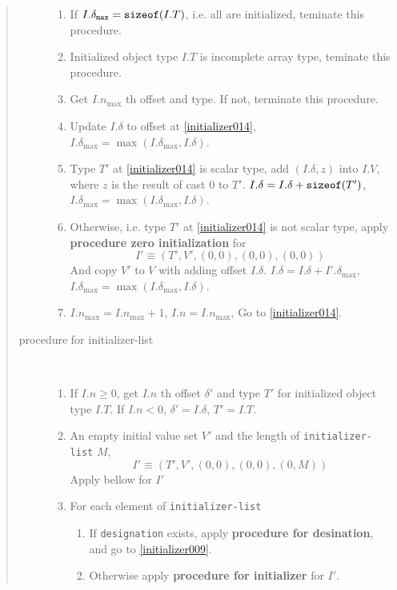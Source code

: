 \begin{quotation}
\begin{description}
\begin{enumerate}
\item If $I.\delta_{\tt{max}} = {\tt sizeof}(I.T)$, i.e.
      all are initialized, teminate this procedure.

\item Initialized object type $I.T$ is incomplete array type,
      teminate this procedure.

\item \label{initializer014} 
      Get $I.n_{\max}$ th offset and type. If not, terminate
      this procedure.

\item Update $I.\delta$ to offset at \ref{initializer014},
      $I.\delta_{\max} = {\max}({I.\delta}_{\max},I.{\delta})$.

\item Type $T'$ at \ref{initializer014} is scalar type,
      add $(I.\delta,z)$ into $I.V$, where $z$ is the result of
      cast $0$ to $T'$.
      $I.\delta = I.\delta + {\tt{sizeof}}(T')$,
       $I.\delta_{\max} = {\max}(I.{\delta}_{\max},I.{\delta})$.

\item Otherwise, i.e. type $T'$ at \ref{initializer014} is not scalar
      type, apply {\bf procedure zero initialization} for
\[
 I' \equiv (T',V',(0,0),(0,0),(0,0))
\]
And copy $V'$ to $V$ with adding offset $I.\delta$.
$I.\delta = I.\delta + I'.{\delta_{\max}}$,
$I.\delta_{\max} = {\max}(I.\delta_{\max},I.\delta)$.

\item $I.n_{\max} = I.n_{\max} + 1$, $I.n = I.n_{\max}$,
Go to \ref{initializer014}.
\end{enumerate}


\item[procedure for initializer-list]

\

\begin{enumerate}
\item \label{initializer005}
      If $I.n \ge 0$, get $I.n$ th offset ${\delta}'$ and
      type $T'$ for initialized object type $I.T$.
      If $I.n < 0$, ${\delta}' = I.{\delta}$, $T' = I.T$.
\item An empty initial value set $V'$ and the length of
      {\tt{initializer-list}} $M$,
\[
 I' \equiv (T',V',(0,0),(0,0),(0,M))
\]
Apply bellow for $I'$

\item \label{initializer009}

For each element of {\tt{initializer-list}}
\begin{enumerate}
\item If {\tt{designation}} exists,
      apply {\bf procedure for desination}, and go to \ref{initializer009}.
\item Otherwise apply {\bf procedure for initializer} for $I'$.
\end{enumerate}


\end{enumerate}
\end{description}
\end{quotation}
